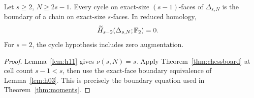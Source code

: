 \begin{corollary}
\label{cor:chessboard-filling}
Let \(s\ge2\), \(N\ge2s-1\). Every cycle on exact-size
\((s-1)\)-faces of \(\Delta_{s,N}\) is the boundary of a chain on
exact-size \(s\)-faces. In reduced homology,
\[
 \widetilde H_{s-2}(\Delta_{s,N};\mathbb F_2)=0.
\]
For \(s=2\), the cycle hypothesis includes zero augmentation.
\end{corollary}
\begin{proof}
Lemma~\ref{lem:h11} gives \(\nu(s,N)=s\).
Apply Theorem~\ref{thm:chessboard} at cell count \(s-1<s\), then use the
exact-face boundary equivalence of Lemma~\ref{lem:h03}. This is precisely
the boundary equation used in Theorem~\ref{thm:moments}.
\end{proof}
